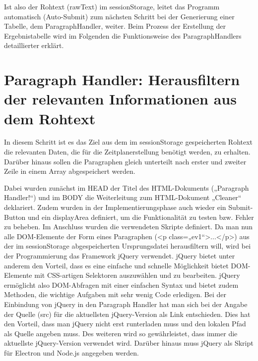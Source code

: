 Ist also der Rohtext (rawText) im sessionStorage, leitet das Programm automatisch (Auto-Submit) zum nächsten Schritt bei der Generierung einer Tabelle, dem ParagraphHandler, weiter. Beim Prozess der Erstellung der Ergebnistabelle wird im Folgenden die Funktionsweise des ParagraphHandlers detaillierter erklärt.

\section{Paragraph Handler: Herausfiltern der relevanten Informationen aus dem Rohtext }

In diesem Schritt ist es das Ziel aus dem im sessionStorage gespeicherten Rohtext die relevanten Daten, die für die Zeitplanerstellung benötigt werden, zu erhalten. Darüber hinaus sollen die Paragraphen gleich unterteilt nach erster und zweiter Zeile in einem Array abgespeichert werden.

Dabei wurden zunächst im HEAD der Titel des HTML-Dokuments („Paragraph Handler!“) und im BODY die Weiterleitung zum HTML-Dokument „Cleaner“ deklariert. Zudem wurden in der Implementierungsphase auch wieder ein Submit-Button und ein displayArea definiert, um die Funktionalität zu testen bzw. Fehler zu beheben. Im Anschluss wurden die verwendeten Skripte definiert. Da man nun alle DOM-Elemente der Form eines Paragraphen (<p class=„ev1“>...</p>) aus der im sessionStorage abgespeicherten Ursprungsdatei herausfiltern will, wird bei der Programmierung das Framework jQuery verwendet. jQuery bietet unter anderem den Vorteil, dass es eine einfache und schnelle Möglichkeit bietet DOM-Elemente mit CSS-artigen Selektoren auszuwählen und zu bearbeiten. jQuery ermöglicht also DOM-Abfragen mit einer einfachen Syntax und bietet zudem Methoden, die wichtige Aufgaben mit sehr wenig Code erledigen. Bei der Einbindung von jQuery in den Paragraph Handler hat man sich bei der Angabe der Quelle (src) für die aktuellsten jQuery-Version als Link entschieden. Dies hat den Vorteil, dass man jQuery nicht erst runterladen muss und den lokalen Pfad als Quelle angeben muss. Des weiteren wird so gewährleistet, dass immer die aktuellste jQuery-Version verwendet wird. Darüber hinaus muss jQuery als Skript für Electron und Node.js angegeben werden. 

